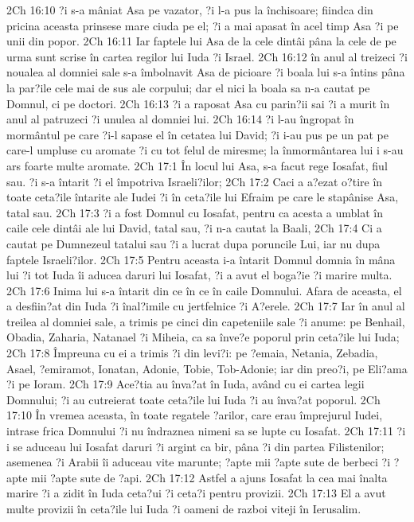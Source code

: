 2Ch 16:10  ?i s-a mâniat Asa pe vazator, ?i l-a pus la închisoare; fiindca din pricina aceasta prinsese mare ciuda pe el; ?i a mai apasat în acel timp Asa ?i pe unii din popor.
2Ch 16:11  Iar faptele lui Asa de la cele dintâi pâna la cele de pe urma sunt scrise în cartea regilor lui Iuda ?i Israel.
2Ch 16:12  în anul al treizeci ?i noualea al domniei sale s-a îmbolnavit Asa de picioare ?i boala lui s-a întins pâna la par?ile cele mai de sus ale corpului; dar el nici la boala sa n-a cautat pe Domnul, ci pe doctori.
2Ch 16:13  ?i a raposat Asa cu parin?ii sai ?i a murit în anul al patruzeci ?i unulea al domniei lui.
2Ch 16:14  ?i l-au îngropat în mormântul pe care ?i-l sapase el în cetatea lui David; ?i i-au pus pe un pat pe care-l umpluse cu aromate ?i cu tot felul de miresme; la înmormântarea lui i s-au ars foarte multe aromate.
2Ch 17:1  În locul lui Asa, s-a facut rege Iosafat, fiul sau. ?i s-a întarit ?i el împotriva Israeli?ilor;
2Ch 17:2  Caci a a?ezat o?tire în toate ceta?ile întarite ale Iudei ?i în ceta?ile lui Efraim pe care le stapânise Asa, tatal sau.
2Ch 17:3  ?i a fost Domnul cu Iosafat, pentru ca acesta a umblat în caile cele dintâi ale lui David, tatal sau, ?i n-a cautat la Baali,
2Ch 17:4  Ci a cautat pe Dumnezeul tatalui sau ?i a lucrat dupa poruncile Lui, iar nu dupa faptele Israeli?ilor.
2Ch 17:5  Pentru aceasta i-a întarit Domnul domnia în mâna lui ?i tot Iuda îi aducea daruri lui Iosafat, ?i a avut el boga?ie ?i marire multa.
2Ch 17:6  Inima lui s-a întarit din ce în ce în caile Domnului. Afara de aceasta, el a desfiin?at din Iuda ?i înal?imile cu jertfelnice ?i A?erele.
2Ch 17:7  Iar în anul al treilea al domniei sale, a trimis pe cinci din capeteniile sale ?i anume: pe Benhail, Obadia, Zaharia, Natanael ?i Miheia, ca sa înve?e poporul prin ceta?ile lui Iuda;
2Ch 17:8  Împreuna cu ei a trimis ?i din levi?i: pe ?emaia, Netania, Zebadia, Asael, ?emiramot, Ionatan, Adonie, Tobie, Tob-Adonie; iar din preo?i, pe Eli?ama ?i pe Ioram.
2Ch 17:9  Ace?tia au înva?at în Iuda, având cu ei cartea legii Domnului; ?i au cutreierat toate ceta?ile lui Iuda ?i au înva?at poporul.
2Ch 17:10  În vremea aceasta, în toate regatele ?arilor, care erau împrejurul Iudei, intrase frica Domnului ?i nu îndraznea nimeni sa se lupte cu Iosafat.
2Ch 17:11  ?i i se aduceau lui Iosafat daruri ?i argint ca bir, pâna ?i din partea Filistenilor; asemenea ?i Arabii îi aduceau vite marunte; ?apte mii ?apte sute de berbeci ?i ?apte mii ?apte sute de ?api.
2Ch 17:12  Astfel a ajuns Iosafat la cea mai înalta marire ?i a zidit în Iuda ceta?ui ?i ceta?i pentru provizii.
2Ch 17:13  El a avut multe provizii în ceta?ile lui Iuda ?i oameni de razboi viteji în Ierusalim.
